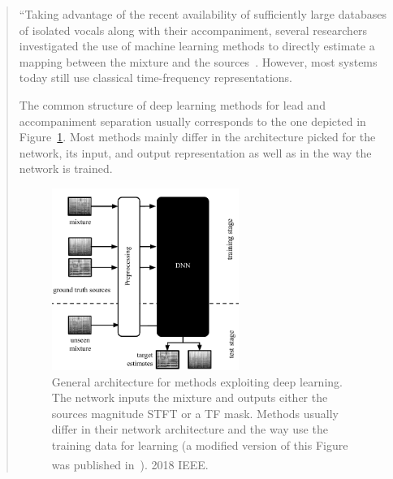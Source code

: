 \begin{quote}
  ``Taking advantage of the recent availability of sufficiently large databases of isolated vocals along with their accompaniment, several researchers investigated the use of machine learning methods to directly estimate a mapping between the mixture and the sources~\cite{huang14, uhlich15}.
  However, most systems today still use classical time-frequency representations.

  The common structure of deep learning methods for lead and accompaniment separation usually corresponds to the one depicted in Figure~\ref{fig:methods_dnn}.
  Most methods mainly differ in the architecture picked for the network, its input, and output representation as well as in the way the network is trained.

  \begin{figure}
    \centering
    \includegraphics[width=0.6\textwidth]{Chapters/06_Separation_Unknown/figures/methods_dnn.pdf}
    \caption{General architecture for methods exploiting deep learning. The network inputs the mixture and outputs either the sources magnitude \acs{STFT} or a TF mask. Methods usually differ in their network architecture and the way use the training data for learning (a modified version of this Figure was published in~\cite{rafii}). \textsuperscript{\textregistered}2018 IEEE.}
    \label{fig:methods_dnn}
  \end{figure}


\end{quote}
